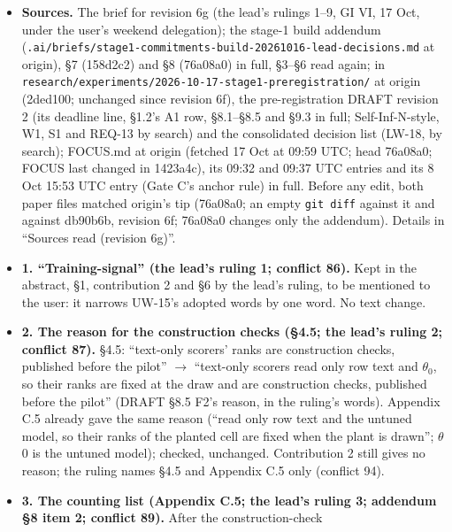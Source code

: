 \documentclass{article}
\theoremstyle{plain}
\theoremstyle{definition}
\theoremstyle{remark}
\begin{document}
\begin{itemize}
  \item \textbf{Sources.} The brief for revision 6g (the lead's rulings 1--9, GI
        VI, 17 Oct, under the user's weekend delegation); the stage-1 build
        addendum
        (\nolinkurl{.ai/briefs/stage1-commitments-build-20261016-lead-decisions.md}
        at origin), \S{}7 (158d2c2) and \S{}8 (76a08a0) in full, \S{}3--\S{}6
        read again; in
        \nolinkurl{research/experiments/2026-10-17-stage1-preregistration/} at
        origin (2ded100; unchanged since revision 6f), the pre-registration
        DRAFT revision 2 (its deadline line, \S{}1.2's A1 row, \S{}8.1--\S{}8.5
        and \S{}9.3 in full; Self-Inf-N-style, W1, S1 and REQ-13 by search) and
        the consolidated decision list (LW-18, by search); FOCUS.md at origin
        (fetched 17 Oct at 09:59 UTC; head 76a08a0; FOCUS last changed in
        1423a4c), its 09:32 and 09:37 UTC entries and its 8 Oct 15:53 UTC entry
        (Gate C's anchor rule) in full. Before any edit, both paper files
        matched origin's tip (76a08a0; an empty \texttt{git diff} against it and
        against db90b6b, revision 6f; 76a08a0 changes only the addendum).
        Details in ``Sources read (revision 6g)''.
  \item \textbf{1. ``Training-signal'' (the lead's ruling 1; conflict 86).} Kept
        in the abstract, \S{}1, contribution 2 and \S{}6 by the lead's ruling,
        to be mentioned to the user: it narrows UW-15's adopted words by one
        word. No text change.
  \item \textbf{2. The reason for the construction checks (\S{}4.5; the lead's
        ruling 2; conflict 87).} \S{}4.5: ``text-only scorers' ranks are
        construction checks, published before the pilot'' $\to$ ``text-only
        scorers read only row text and $\theta_0$, so their ranks are fixed at
        the draw and are construction checks, published before the pilot''
        (DRAFT \S{}8.5 F2's reason, in the ruling's words). Appendix C.5 already
        gave the same reason (``read only row text and the untuned model, so
        their ranks of the planted cell are fixed when the plant is drawn'';
        $\theta$0 is the untuned model); checked, unchanged. Contribution 2
        still gives no reason; the ruling names \S{}4.5 and Appendix C.5 only
        (conflict 94).
  \item \textbf{3. The counting list (Appendix C.5; the lead's ruling 3;
        addendum \S{}8 item 2; conflict 89).} After the construction-check

\end{itemize}
\end{document}
